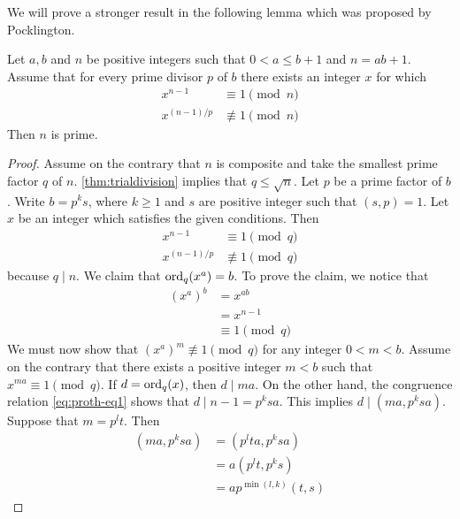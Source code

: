 \documentclass{subfiles}
\begin{document}
	We will prove a stronger result in the following lemma which was proposed by Pocklington.

		\begin{lemma}
			Let $a, b$ and $n$  be positive integers such that $0<a \leq b+1$ and $n=ab+1$. Assume that for every prime divisor $p$ of $b$ there exists an integer $x$ for which
				\begin{align*}
					x^{n-1} &\equiv 1 \pmod n\\
					x^{(n-1)/p} &\not \equiv 1 \pmod n
				\end{align*}
			Then $n$ is prime.
		\end{lemma}

		\begin{proof}
			Assume on the contrary that $n$ is composite and take the smallest prime factor $q$ of $n$. \autoref{thm:trialdivision} implies that $q \leq \sqrt n$. Let $p$ be a prime factor of $b$. Write $b=p^ks$, where $k\geq 1$ and $s$ are positive integer such that $(s,p)=1$. Let $x$ be an integer which satisfies the given conditions. Then
					\begin{align}
						x^{n-1} &\equiv 1 \pmod q\label{eq:proth-eq1}\\
						x^{(n-1)/p} &\not \equiv 1 \pmod q\label{eq:proth-eq2}
					\end{align}
			because $q\mid n$. We claim that $\operatorname{ord}_q(x^a)=b$. To prove the claim, we notice that
				\begin{align*}
					\left(x^{a}\right)^b &= x^{ab}\\
						&= x^{n-1}\\
						&\equiv 1 \pmod q
				\end{align*}
			We must now show that $\left(x^{a}\right)^m \not \equiv 1 \pmod q$ for any integer $0<m<b$. Assume on the contrary that there exists a positive integer $m<b$ such that $x^{ma} \equiv 1 \pmod q$. If $d=\operatorname{ord}_q(x)$, then $d\mid ma$. On the other hand, the congruence relation \eqref{eq:proth-eq1} shows that $d\mid n-1=p^ksa$. This implies $d\mid (ma, p^ksa)$. Suppose that $m=p^lt$. Then
				\begin{align*}
					\left(ma, p^ksa\right) &= \left(p^lta, p^ksa\right)\\
								&= a \left(p^lt, p^ks\right)\\
								&= a p^{\min(l,k)} (t,s)
				\end{align*}


\end{proof}
\end{document}
